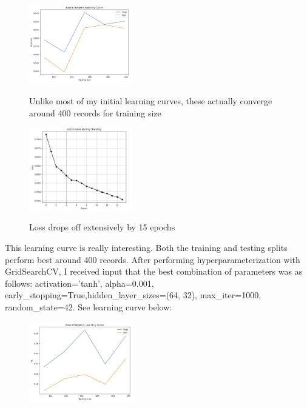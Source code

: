 \documentclass[conference]{IEEEtran}
\begin{document}
\begin{figure}[H]
    \centering
    \includegraphics[width=0.40\textwidth]{Red Wine Quality Graph Images/Neural Nets/nn lc init.png}
    \label{fig:enter-label}
    \caption{Unlike most of my initial learning curves, these actually converge around 400 records for training size}
\end{figure}

\begin{figure}[H]
    \centering
    \includegraphics[width=0.40\textwidth]{Red Wine Quality Graph Images/Neural Nets/nn loss curve.png}
    \label{fig:enter-label}
    \caption{Loss drops off extensively by 15 epochs}
\end{figure}

This learning curve is really interesting. Both the training and testing splits perform best around 400 records. After performing hyperparameterization with GridSearchCV, I received input that the best combination of parameters was as follows: {activation='tanh'}, {alpha=0.001}, {early\_stopping=True},{hidden\_layer\_sizes=(64, 32)}, {max\_iter=1000}, {random\_state=42}. See learning curve below:

\begin{figure}[H]
    \centering
    \includegraphics[width=0.40\textwidth]{Red Wine Quality Graph Images/Neural Nets/nn lc final.png}
    \label{fig:enter-label}
\end{figure}
\end{document}
